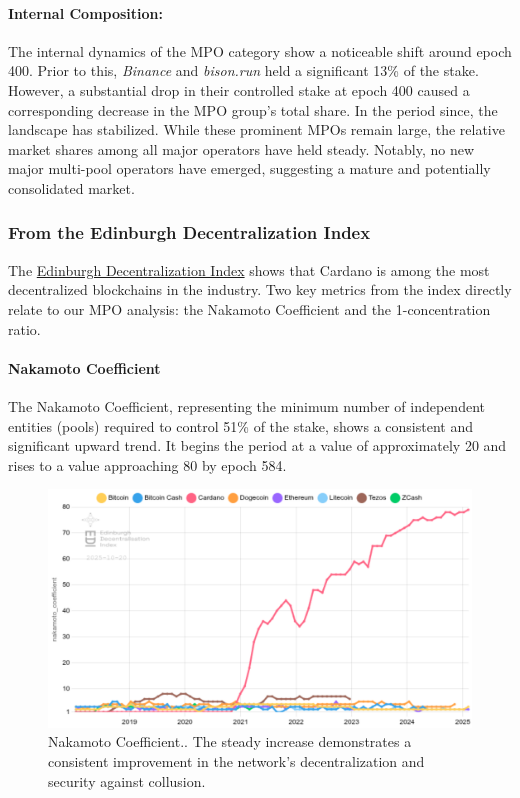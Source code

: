\documentclass[11pt, letterpaper]{article}
\begin{document}
\paragraph{Internal Composition:} The internal dynamics of the MPO category show a noticeable
shift around epoch 400. Prior to this, \textit{Binance} and \textit{bison.run} held a significant 13\% of the
stake. However, a substantial drop in their controlled stake at epoch 400 caused a
corresponding decrease in the MPO group's total share. In the period since, the landscape
has stabilized. While these prominent MPOs remain large, the relative market shares among
all major operators have held steady. Notably, no new major multi-pool operators have
emerged, suggesting a mature and potentially consolidated market.

\subsubsection{From the Edinburgh Decentralization Index}

The \href{https://blockchainlab.inf.ed.ac.uk/edi-dashboard/}{Edinburgh Decentralization Index} shows
that Cardano is among the most decentralized blockchains in the industry. Two key metrics
from the index directly relate to our MPO analysis: the Nakamoto Coefficient and the 1-concentration ratio.

\paragraph{Nakamoto Coefficient} The Nakamoto Coefficient, representing the minimum number of
independent entities (pools) required to control 51\% of the stake, shows a consistent and significant
upward trend. It begins the period at a value of approximately 20 and rises to a value
approaching 80 by epoch 584.

\begin{figure}[H]
	\centering
	\includegraphics[width=\textwidth]{img/consensus-nakamoto_coefficient-chart.png}
	\caption{Nakamoto Coefficient.. The steady increase demonstrates a consistent
		improvement in the network's decentralization and security against collusion.}
	\label{fig:nakamoto}
\end{figure}
\end{document}

